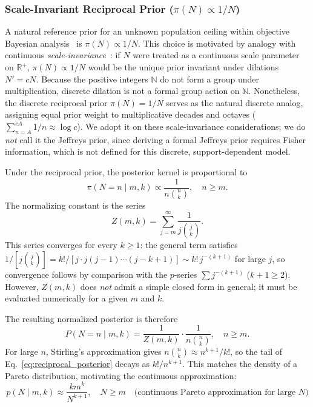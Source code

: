 \documentclass[10pt,a4paper]{article}
\begin{document}
\subsubsection{Scale-Invariant Reciprocal Prior (\texorpdfstring{$\pi(N) \propto 1/N$}{pi(N) propto 1/N})}
A natural reference prior for an unknown population ceiling within objective Bayesian analysis~\cite{bernardo1994} is $\pi(N) \propto 1/N$. This choice is motivated by analogy with continuous \emph{scale-invariance}~\cite{jeffreys1961}: if $N$ were treated as a continuous scale parameter on $\mathbb{R}^+$, $\pi(N) \propto 1/N$ would be the unique prior invariant under dilations $N' = cN$. Because the positive integers $\mathbb{N}$ do not form a group under multiplication, discrete dilation is not a formal group action on $\mathbb{N}$. Nonetheless, the discrete reciprocal prior $\pi(N) = 1/N$ serves as the natural discrete analog, assigning equal prior weight to multiplicative decades and octaves ($\sum_{n=A}^{cA} 1/n \approx \log c$). We adopt it on these scale-invariance considerations; we do \emph{not} call it the Jeffreys prior, since deriving a formal Jeffreys prior requires Fisher information, which is not defined for this discrete, support-dependent model.

Under the reciprocal prior, the posterior kernel is proportional to
\begin{equation}
\pi(N = n \mid m, k) \propto \frac{1}{n\binom{n}{k}}, \quad n \ge m.
\label{eq:reciprocal_kernel}
\end{equation}
The normalizing constant is the series
\begin{equation}
Z(m, k) = \sum_{j=m}^{\infty} \frac{1}{j\binom{j}{k}}.
\label{eq:reciprocal_normalizing}
\end{equation}
This series converges for every $k \ge 1$: the general term satisfies $1/[j\binom{j}{k}] = k!/[j \cdot j(j-1)\cdots(j-k+1)] \sim k!\,j^{-(k+1)}$ for large $j$, so convergence follows by comparison with the $p$-series $\sum j^{-(k+1)}$ ($k+1 \ge 2$).  However, $Z(m,k)$ does \emph{not} admit a simple closed form in general; it must be evaluated numerically for a given $m$ and $k$.

The resulting normalized posterior is therefore
\begin{equation}
P(N = n \mid m, k) = \frac{1}{Z(m,k)} \cdot \frac{1}{n\binom{n}{k}}, \quad n \ge m.
\label{eq:reciprocal_posterior}
\end{equation}
For large $n$, Stirling's approximation gives $n\binom{n}{k} \approx n^{k+1}/k!$, so the tail of Eq.~\eqref{eq:reciprocal_posterior} decays as $k!/n^{k+1}$.  This matches the density of a Pareto distribution, motivating the continuous approximation:
\begin{equation}
p(N \mid m, k) \approx \frac{k m^k}{N^{k+1}}, \quad N \ge m \quad \text{(continuous Pareto approximation for large } N\text{)}
\label{eq:pareto_limit}
\end{equation}
\end{document}
